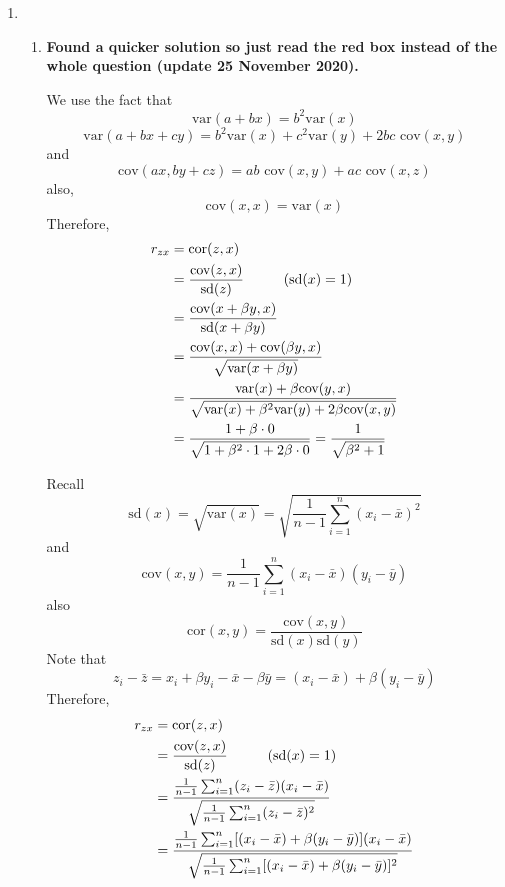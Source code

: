 \documentclass{article}
\begin{document}
\begin{enumerate}
    \item
    \begin{enumerate}
        \item \textbf{Found a quicker solution so just read the red box instead of the whole question (update 25 November 2020).}\\
        \begin{tcolorbox}[colback=red!10, colframe=red]
        We use the fact that
        \[\text{var}(a+bx)=b^2\text{var}(x)\]
        \[\text{var}(a+bx+cy)=b^2\text{var}(x)+c^2\text{var}(y)+2bc\text{ cov}(x,y)\]
        and
        \[\text{cov}(ax,by+cz)=ab\text{ cov}(x,y)+ac\text{ cov}(x,z)\]
        also,
        \[\text{cov}(x,x)=\text{var}(x)\]
        Therefore,
        \begin{align*}
            r_{zx}&=\text{cor}(z,x)\\
            &=\frac{\text{cov}(z,x)}{\text{sd}(z)} \hspace{1 cm}(\text{sd}(x) = 1)\\
            &=\frac{\text{cov}(x+\beta y,x)}{\text{sd}(x+\beta y)}\\
            &=\frac{\text{cov}(x,x)+\text{cov}(\beta y,x)}{\sqrt{\text{var}(x+\beta y)}}\\
            &=\frac{\text{var}(x)+\beta\text{cov}(y,x)}{\sqrt{\text{var}(x)+\beta^2\text{var}(y)+2\beta\text{cov}(x,y)}}\\
            &=\frac{1+\beta\cdot0}{\sqrt{1+\beta^2\cdot1+2\beta\cdot0}} = \frac{1}{\sqrt{\beta^2+1}}
        \end{align*}
        \end{tcolorbox}
        Recall
        \[\text{sd}(x)=\sqrt{\text{var}(x)}=\sqrt{\frac{1}{n-1}\sum_{i=1}^{n}(x_i-\bar{x})^2}\]
        and
        \[\text{cov}(x,y)=\frac{1}{n-1}\sum_{i=1}^{n}(x_i-\bar{x})(y_i-\bar{y})\]
        also
        \[\text{cor}(x,y)=\frac{\text{cov}(x,y)}{\text{sd}(x)\text{sd}(y)}\]
        Note that
        \[z_i-\bar{z}=x_i+\beta y_i-\bar{x}-\beta \bar{y} = (x_i-\bar{x}) + \beta(y_i-\bar{y})\]
        Therefore,
        \begin{align*}
            r_{zx}&=\text{cor}(z,x)\\
            &=\frac{\text{cov}(z,x)}{\text{sd}(z)} \hspace{1 cm}(\text{sd}(x) = 1)\\
            &=\frac{\frac{1}{n-1}\sum_{i=1}^{n}(z_i-\bar{z})(x_i-\bar{x})}{\sqrt{\frac{1}{n-1}\sum_{i=1}^{n}(z_i-\bar{z})^2}}\\
            &=\frac{\frac{1}{n-1}\sum_{i=1}^{n}[(x_i-\bar{x}) + \beta(y_i-\bar{y})](x_i-\bar{x})}{\sqrt{\frac{1}{n-1}\sum_{i=1}^{n}[(x_i-\bar{x}) + \beta(y_i-\bar{y})]^2}}\\

\end{align*}
\end{enumerate}
\end{enumerate}
\end{document}

